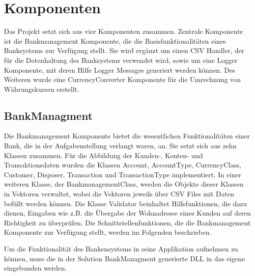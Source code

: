 \section{Komponenten}
Das Projekt setzt sich aus vier Komponenten zusammen. Zentrale Komponente ist die Bankmanagement Komponente, die die Basisfunktionalitäten eines Banksystems zur Verfügung stellt. Sie wird ergänzt um einen CSV Handler, der für die Datenhaltung des Banksystems verwendet wird, sowie um eine Logger Komponente, mit deren Hilfe Logger Messages generiert werden können. Des Weiteren wurde eine CurrencyConverter Komponente für die Umrechnung von Währungskursen erstellt.


\subsection{BankManagment}
Die Bankmanagement Komponente bietet die wesentlichen Funktionalitäten einer Bank, die in der Aufgabenstellung verlangt waren, an. Sie setzt sich aus zehn Klassen zusammen. Für die Abbildung der Kunden-, Konten- und Transaktionsdaten wurden die Klassen Account, AccountType, CurrencyClass, Customer, Disposer, Transaction und TransactionType implementiert. In einer weiteren Klasse, der BankmanagementClass, werden die Objekte dieser Klassen in Vektoren verwaltet, wobei die Vektoren jeweils über CSV Files mit Daten befüllt werden können. Die Klasse Validator beinhaltet Hilfsfunktionen, die dazu dienen, Eingaben wie z.B. die Übergabe der Wohnadresse eines Kunden auf deren Richtigkeit zu überprüfen. Die Schnittstellenfunktionen, die die Bankmanagement Komponente zur Verfügung stellt, werden im Folgenden beschrieben.

Um die Funktionalität des Bankensystems in seine Applikation aufnehmen zu können, muss die in der Solution BankManagment generierte DLL in das eigene eingebunden werden.

